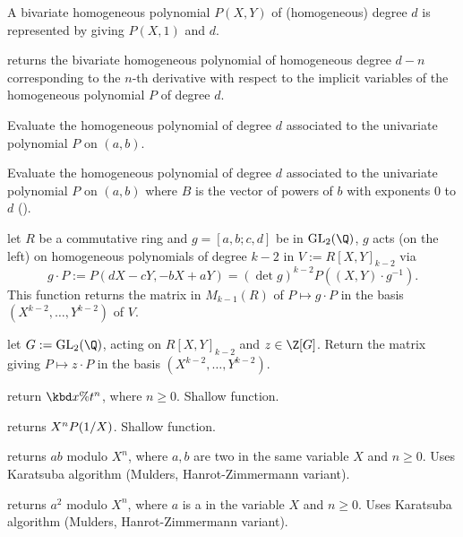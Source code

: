 
A bivariate homogeneous polynomial $P(X,Y)$ of (homogeneous) degree $d$ is
represented by giving $P(X,1)$ and $d$.

 returns the bivariate
homogeneous polynomial of homogeneous degree $d-n$ corresponding to the $n$-th
derivative with respect to the implicit variables of the homogeneous polynomial
$P$ of degree $d$.

Evaluate the homogeneous polynomial of degree $d$ associated to the
univariate polynomial $P$ on $(a,b)$.

Evaluate the homogeneous polynomial of degree $d$ associated to the
univariate polynomial $P$ on $(a,b)$ where $B$ is the vector of powers of $b$
with exponents $0$ to $d$ ().


 let $R$ be a commutative ring
and $g = [a,b;c,d]$ be in $\text{GL}_2(\Q)$, $g$ acts (on the left)
on homogeneous polynomials of degree $k-2$ in $V := R[X,Y]_{k-2}$ via
$$ g\cdot P := P(dX-cY, -bX+aY) = (\det g)^{k-2} P((X,Y)\cdot g^{-1}).$$
This function returns the matrix in $M_{k-1}(R)$ of $P\mapsto g\cdot P$ in
the basis $(X^{k-2},\dots,Y^{k-2})$ of $V$.

 let $G:=\text{GL}_2(\Q)$, acting
on $R[X,Y]_{k-2}$ and $z\in \Z[G]$. Return the matrix giving
$P\mapsto z\cdot P$ in the basis $(X^{k-2},\dots,Y^{k-2})$.


 return $\kbd{x \% } t^n$,
where $n\geq 0$. Shallow function.

 returns $X^n\*P(1/X)$. Shallow function.

 returns $a b$ modulo $X^n$,
where $a,b$ are two  in the same variable $X$ and $n \geq 0$. Uses
Karatsuba algorithm (Mulders, Hanrot-Zimmermann variant).

 returns $a^2$ modulo $X^n$,
where $a$ is a  in the variable $X$ and $n \geq 0$. Uses
Karatsuba algorithm (Mulders, Hanrot-Zimmermann variant).

